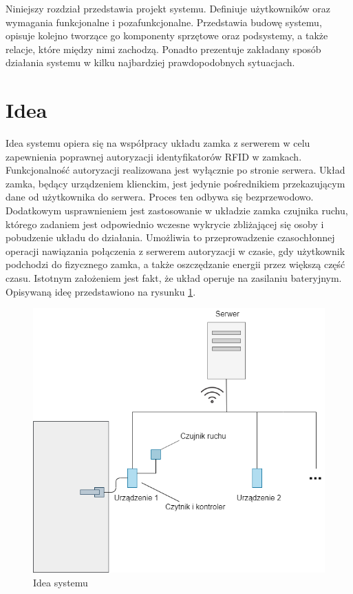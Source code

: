 \label{chap:hl-arch}

    Niniejszy rozdział przedstawia projekt systemu. Definiuje użytkowników oraz wymagania funkcjonalne i pozafunkcjonalne. Przedstawia budowę systemu, opisuje kolejno tworzące go komponenty sprzętowe oraz podsystemy, a także relacje, które między nimi zachodzą. Ponadto prezentuje zakładany sposób działania systemu w kilku najbardziej prawdopodobnych sytuacjach.

    \section{Idea}
        Idea systemu opiera się na współpracy układu zamka z serwerem w celu zapewnienia poprawnej autoryzacji identyfikatorów RFID w zamkach. Funkcjonalność autoryzacji realizowana jest wyłącznie po stronie serwera. Układ zamka, będący urządzeniem klienckim, jest jedynie pośrednikiem przekazującym dane od użytkownika do serwera. Proces ten odbywa się bezprzewodowo. Dodatkowym usprawnieniem jest zastosowanie w układzie zamka czujnika ruchu, którego zadaniem jest odpowiednio wczesne wykrycie zbliżającej się osoby i pobudzenie układu do działania. Umożliwia to przeprowadzenie czasochłonnej operacji nawiązania połączenia z serwerem autoryzacji w czasie, gdy użytkownik podchodzi do fizycznego zamka, a także oszczędzanie energii przez większą część czasu. Istotnym założeniem jest fakt, że układ operuje na zasilaniu bateryjnym. Opisywaną ideę przedstawiono na rysunku \ref{fig:door}.

        \begin{figure}[h!]
            \begin{center}
                \includegraphics[width=.8\linewidth]{chapters/images/door2.png}
                \caption{Idea systemu}
                \label{fig:door}
            \end{center}
        \end{figure}


